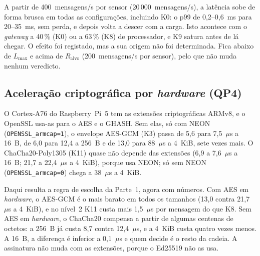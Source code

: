 A partir de 400~mensagens/s por sensor (20\,000~mensagens/s), a latência sobe de
forma brusca  em todas as configurações, incluindo K0:  o p99 de 0,2--0,6~ms para 20--35~ms, sem perda, e depois
volta a descer com a carga.  Isto acontece com o
\emph{gateway} a 40\,\% (K0) ou a 63\,\% (K8) de processador,  e K9 satura antes de lá chegar. O efeito foi registado, mas a sua
origem não foi determinada. Fica abaixo de $L_{\max}$ e acima de
$R_{\text{alvo}}$ (200~mensagens/s por sensor), pelo que não muda nenhum
veredicto.


\subsection{Aceleração criptográfica por \emph{hardware} (QP4)}
\label{sec:aceleracao}


O Cortex-A76 do Raspberry~Pi~5 tem as extensões criptográficas ARMv8, e o
OpenSSL usa-as para o AES e o GHASH. Sem elas, só com NEON
(\texttt{OPENSSL\_armcap=1}), o envelope AES-GCM (K3) passa de 5,6 para 7,5~$\mu$s
a 16~B, de 6,0 para 12,4 a 256~B e de 13,0 para 88~$\mu$s a 4~KiB, sete vezes
mais. O ChaCha20-Poly1305 (K11) quase não depende das extensões (6,9 a 7,6~$\mu$s
a 16~B; 21,7 a 22,4~$\mu$s a 4~KiB), porque usa NEON; só sem NEON
(\texttt{OPENSSL\_armcap=0}) chega a 38~$\mu$s a 4~KiB.

Daqui resulta a regra de escolha da Parte~1, agora com números. Com AES em
\emph{hardware}, o AES-GCM é o mais barato em todos os tamanhos (13,0 contra
21,7~$\mu$s a 4~KiB), e no nível~2 K11 custa mais 1,5~$\mu$s por mensagem do que
K8. Sem AES em \emph{hardware}, o ChaCha20 compensa a partir de algumas centenas
de octetos: a 256~B já custa 8,7 contra 12,4~$\mu$s, e a 4~KiB custa quatro vezes
menos. A 16~B, a diferença é inferior a 0,1~$\mu$s e quem decide é o resto da
cadeia. A assinatura não muda com as extensões, porque o Ed25519 não as usa.

